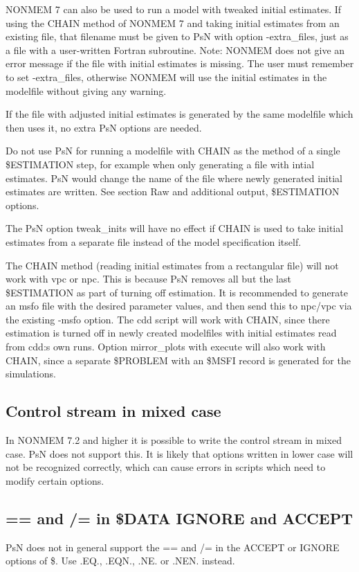 	NONMEM 7 can also be used to run a model with tweaked initial estimates. If using the CHAIN method of NONMEM 7 and taking initial estimates from an existing file, that filename must be given to PsN with option -extra\_files, just as a file with a user-written Fortran subroutine. Note: NONMEM does not give an error message if the file with initial estimates is missing. The user must remember to set -extra\_files, otherwise NONMEM will use the initial estimates in the modelfile without giving any warning.
	
	If the file with adjusted initial estimates is generated by the same modelfile which then uses it, no extra PsN options are needed.
	
	Do not use PsN for running a modelfile with CHAIN as the method of a single \$ESTIMATION step, for example when only generating a file with intial estimates. PsN would change the name of the file where newly generated initial estimates are written. See section Raw and additional output, \$ESTIMATION options.
	
	The PsN option tweak\_inits will have no effect if CHAIN is used to take initial estimates from a separate file instead of the model specification itself.
	
	The CHAIN method (reading initial estimates from a rectangular file) will not work with vpc or npc. This is because PsN removes all but the last \$ESTIMATION as part of turning off estimation. It is recommended to generate an msfo file with the desired parameter values, and then send this to npc/vpc via the existing -msfo option. The cdd script will work with CHAIN, since there estimation is turned off in newly created modelfiles with initial estimates read from cdd:s own runs. Option mirror\_plots with execute will also work with CHAIN, since a separate \$PROBLEM with an \$MSFI record is generated for the simulations.
	
	\subsection{Control stream in mixed case}
	In NONMEM 7.2 and higher it is possible to write the control stream in mixed case. PsN does not support this. It is likely that options written in lower case will not be recognized correctly, which can cause errors in scripts which need to modify certain options.

    \subsection{== and /= in \$DATA IGNORE and ACCEPT}
    PsN does not in general support the == and /= in the ACCEPT or IGNORE options of \$. Use .EQ., .EQN., .NE. or .NEN. instead.

